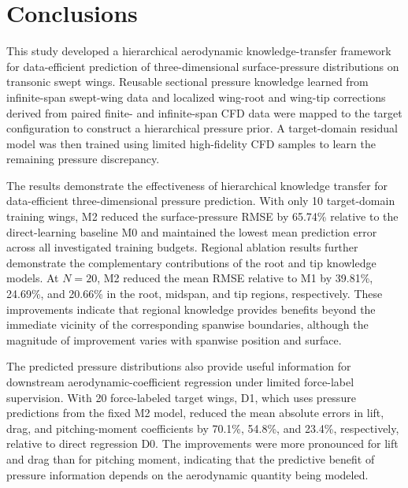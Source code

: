 
\section{Conclusions}
\label{sec:conclusions}

This study developed a hierarchical aerodynamic knowledge-transfer framework for data-efficient prediction of three-dimensional surface-pressure distributions on transonic swept wings. Reusable sectional pressure knowledge learned from infinite-span swept-wing data and localized wing-root and wing-tip corrections derived from paired finite- and infinite-span CFD data were mapped to the target configuration to construct a hierarchical pressure prior. A target-domain residual model was then trained using limited high-fidelity CFD samples to learn the remaining pressure discrepancy.

The results demonstrate the effectiveness of hierarchical knowledge transfer for data-efficient three-dimensional pressure prediction. With only 10 target-domain training wings, M2 reduced the surface-pressure RMSE by 65.74\% relative to the direct-learning baseline M0 and maintained the lowest mean prediction error across all investigated training budgets. Regional ablation results further demonstrate the complementary contributions of the root and tip knowledge models. At $N=20$, M2 reduced the mean RMSE relative to M1 by 39.81\%, 24.69\%, and 20.66\% in the root, midspan, and tip regions, respectively. These improvements indicate that regional knowledge provides benefits beyond the immediate vicinity of the corresponding spanwise boundaries, although the magnitude of improvement varies with spanwise position and surface.

The predicted pressure distributions also provide useful information for downstream aerodynamic-coefficient regression under limited force-label supervision. With 20 force-labeled target wings, D1, which uses pressure predictions from the fixed M2 model, reduced the mean absolute errors in lift, drag, and pitching-moment coefficients by 70.1\%, 54.8\%, and 23.4\%, respectively, relative to direct regression D0. The improvements were more pronounced for lift and drag than for pitching moment, indicating that the predictive benefit of pressure information depends on the aerodynamic quantity being modeled.

